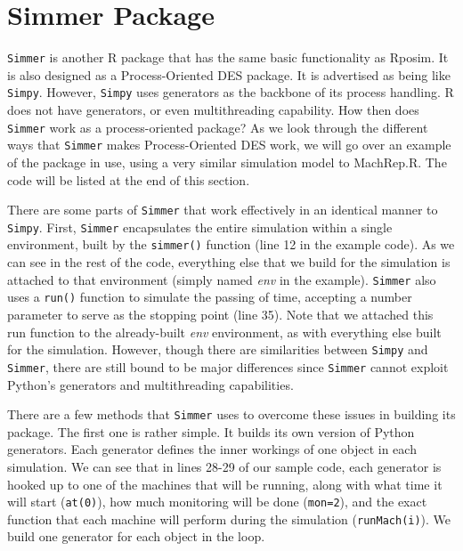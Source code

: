 \documentclass[a4paper, 11pt]{article} %
\begin{document}

\section{Simmer Package}

\texttt{Simmer} is another R package that has the same basic functionality as Rposim. It is also designed as a Process-Oriented DES package. It is advertised as being like \texttt{Simpy}. However, \texttt{Simpy} uses generators as the backbone of its process handling. R does not have generators, or even multithreading capability. How then does \texttt{Simmer} work as a process-oriented package? As we look through the different ways that \texttt{Simmer} makes Process-Oriented DES work, we will go over an example of the package in use, using a very similar simulation model to MachRep.R. The code will be listed at the end of this section.

There are some parts of \texttt{Simmer} that work effectively in an identical manner to \texttt{Simpy}. First, \texttt{Simmer} encapsulates the entire simulation within a single environment, built by the \texttt{simmer()} function (line 12 in the example code). As we can see in the rest of the code, everything else that we build for the simulation is attached to that environment (simply named \textit{env} in the example). \texttt{Simmer} also uses a \texttt{run()} function to simulate the passing of time, accepting a number parameter to serve as the stopping point (line 35). Note that we attached this run function to the already-built \textit{env} environment, as with everything else built for the simulation. However, though there are similarities between \texttt{Simpy} and \texttt{Simmer}, there are still bound to be major differences since \texttt{Simmer} cannot exploit Python's generators and multithreading capabilities.

There are a few methods that \texttt{Simmer} uses to overcome these issues in building its package. The first one is rather simple. It builds its own version of Python generators. Each generator defines the inner workings of one object in each simulation. We can see that in lines 28-29 of our sample code, each generator is hooked up to one of the machines that will be running, along with what time it will start (\texttt{at(0)}), how much monitoring will be done (\texttt{mon=2}), and the exact function that each machine will perform during the simulation (\texttt{runMach(i)}). We build one generator for each object in the loop.
\end{document}
